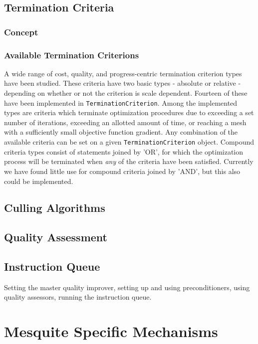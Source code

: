 \documentclass[letter]{report}
\begin{document}
\subsection{Termination Criteria}

\subsubsection{Concept}

\subsubsection{Available Termination Criterions}
A wide range of cost, quality, 
and progress-centric termination
criterion types have been studied. These criteria have two basic types - 
absolute or relative - depending on whether or not the criterion is scale 
dependent.  Fourteen of these have been
implemented in \texttt{TerminationCriterion}.  Among the implemented
types are criteria which terminate optimization procedures due to
exceeding a set number of iterations, exceeding an allotted amount of
time, or reaching a mesh with a sufficiently small objective function
gradient.  Any combination of the available criteria can be set on a given
\texttt{TerminationCriterion} object.  Compound criteria types consist
of statements joined by 'OR', for which 
the optimization process will be terminated when {\it any} of
the criteria have been satisfied.  Currently we have found little use
for compound criteria joined by 'AND', but this also could be implemented. 

\subsection{Culling Algorithms}

\subsection{Quality Assessment}

\subsection{Instruction Queue}
Setting the master quality improver, setting up and using preconditioners,
using quality assessors, running the instruction queue.



\section{Mesquite Specific Mechanisms}
\end{document}
